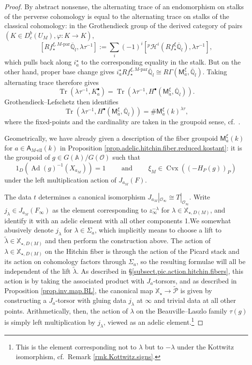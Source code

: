 \documentclass[openany]{amsbook}
\theoremstyle{definition}
\theoremstyle{remark}
\numberwithin{equation}{section}
\newcommand{\Q}{\mathbb{Q}}
\renewcommand{\O}{\mathcal{O}}
\newcommand{\cP}{\mathcal{P}}
\newcommand{\A}{\mathbb{A}}
\newcommand{\ol}[1]{\overline{#1}}
\newcommand{\Tr}{\operatorname{Tr }}
\renewcommand{\phi}{\varphi}
\renewcommand{\-}{\operatorname{-}}
\newcommand{\Cvx}{\operatorname{Cvx}}
\newcommand{\on}[1]{\operatorname{#1}}
\newcommand{\pHi}{{}^p \mathcal{H}^i}
\newcommand{\wtilde}[1]{\widetilde{#1}}
\renewcommand{\A}{\mathbb{A}}
\newcommand{\el}{\text{-ell}}
\newcommand{\ctP}{\widetilde{\cP}}
\newcommand{\bM}{\mathsf{M}}
\newcommand{\bA}{\mathsf{A}}
\newcommand{\bX}{\mathbb{X}}
\newcommand{\bAe}[1]{\bA_{#1\el}}
\newcommand{\Ad}{\on{Ad}}
\newcommand{\Mpar}{M\text{-par}}
\begin{document}
\begin{proof}
    By abstract nonsense, the alternating trace of an endomorphism on stalks of the perverse cohomology is equal to the alternating trace on stalks of the classical cohomology: in the Grothendieck group of the derived category of pairs $(K \in D^b_c(U_M), \phi : K \to K)$, 
    $$
        [R f_\star^{\xi,\Mpar} \ol{\Q}_l, \lambda \tau^{-1}] := \sum_i (-1)^i [\pHi(R f_\star^{\xi} \ol{\Q}_l), \lambda \tau^{-1}],
    $$
    which pulls back along $i_a^\star$ to the corresponding equality in the stalk. But on the other hand, proper base change gives $i_a^\star R f_\star^{\xi, \Mpar} \ol{\Q}_l \cong R\Gamma(\bM^\xi_a, \ol{\Q}_l)$. Taking alternating trace therefore gives 
    $$
    \Tr(\lambda \tau^{-1}, K_a^{\bullet}) = \Tr(\lambda \tau^{-1}, H^\bullet(\bM^{\xi}_a, \ol{\Q}_l)).
    $$
    Grothendieck--Lefschetz then identifies 
    $$
        \Tr(\lambda \tau^{-1}, H^\bullet(\bM^{\xi}_a, \ol{\Q}_l)) = \# \bM_a^\xi(k)^{\lambda \tau},
    $$
    where the fixed-points and the cardinality are taken in the groupoid sense, cf.\ \cite[\S 8.1]{ngofl}.

    Geometrically, we have already given a description of the fiber groupoid $\bM_a^{\xi}(k)$ for $a \in \bAe{M}(k)$ in Proposition \ref{prop.adelic.hitchin.fiber.reduced.kostant}: it is the groupoid of $g \in G(\A)/G(\O)$ such that \begin{equation}\label{eqn.wtd.stab.conds.g}
    1_D(\Ad(g)^{-1}(X_{a_M})) = 1 \qquad \text{ and } \qquad 
        \xi_M \in \Cvx((-H_P(g))_{P})
    \end{equation}
    under the left multiplication action of $J_{a_M}(F)$.
    
    The data $t$ determines a canonical isomorphism $J_{a_M}|_{\O_\infty} \cong T|_{\O_\infty}$. Write $j_{\lambda} \in J_{a_M}(F_\infty)$ as the element corresponding to $z_\infty^{-\lambda}$ for $\lambda \in \bX_{\star, D(M)}$, and identify it with an adelic element with all other components 1.We somewhat abusively denote $j_\lambda$ for $\lambda \in \Sigma_a$, which implicitly means to choose a lift to $\wtilde{\lambda} \in \bX_{\star, D(M)}$ and then perform the construction above. The action of $\lambda \in \bX_{\star, D(M)}$ on the Hitchin fiber is through the action of the Picard stack and its action on cohomology factors through $\Sigma_a$, so the resulting formulae will all be independent of the lift $\wtilde{\lambda}$. As described in \S\ref{subsect.pic.action.hitchin.fibers}, this action is by taking the associated product with $J_a$-torsors, and as described in Proposition \ref{prop.inv.map.BL}, the canonical map $\bX_\star \to \ctP$ is given by constructing a $J_a$-torsor with gluing data $j_{\lambda}$ at $\infty$ and trivial data at all other points. Arithmetically, then, the action of $\lambda$ on the Beauville--Laszlo family $\tau(g)$ is simply left multiplication by $j_{\lambda}$, viewed as an adelic element.\footnote{This is the element corresponding not to $\lambda$ but to $-\lambda$ under the Kottwitz isomorphism, cf.\ Remark \ref{rmk.Kottwitz.signs}.} 
    

\end{proof}
\end{document}
